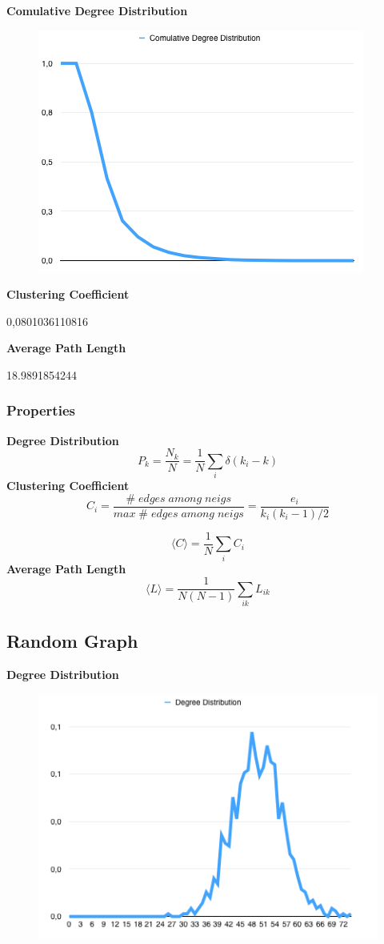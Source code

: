 \documentclass[a4paper,titlepage,11pt]{article}
\begin{document}
\textbf{Comulative Degree Distribution}

\begin{figure}[h]
    \centering
    \includegraphics[scale=0.50]{img/cdd-dataset.png}
\end{figure}

\textbf{Clustering Coefficient}

0,0801036110816

\textbf{Average Path Length}

18.9891854244


\subsubsection{Properties}
\textbf{Degree Distribution}
\[
  P_k = \frac{N_k}{N} = \frac{1}{N}\sum_{i}{\delta(k_i-k)}
\]
\textbf{Clustering Coefficient}
\[
  C_i = \frac{\#\; edges\; among\; neigs}{max\; \# \; edges\; among \; neigs} = \frac{e_i}{k_i(k_i-1)/2}
\]

\[
  \langle C\rangle = \frac{1}{N}\sum_{i}{C_i}
\]
\textbf{Average Path Length}
\[
  \langle L\rangle = \frac{1}{N(N-1)}\sum_{ik}{L_{ik}}
\]

\subsection{Random Graph}
\textbf{Degree Distribution}

\begin{figure}[h]
    \centering
    \includegraphics[scale=0.50]{img/dd-1000-0.05.png}
\end{figure}
\end{document}
